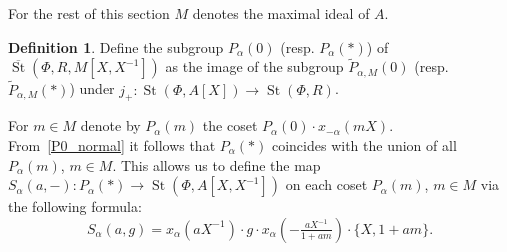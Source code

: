 \documentclass[oneside, 8pt]{amsart}
\theoremstyle{remark}
\theoremstyle{definition}
\numberwithin{lemma}{section}
\numberwithin{prop}{section}
\numberwithin{corollary}{section}
\numberwithin{externaltheorem}{section}
\newtheorem{df}[lemma]{Definition} \Crefname{df}{Definition}{Definitions}
\DeclareMathOperator{\St}{St}
\numberwithin{equation}{section}
\begin{document}
For the rest of this section $M$ denotes the maximal ideal of $A$.
\begin{df}\label{S-def}
Define the subgroup $P_\alpha(0)$ (resp. $P_{\alpha}(*)$) of $\overline{\St}(\Phi, R, M[X, X^{-1}])$
 as the image of the subgroup $\widetilde{P}_{\alpha, M}(0)$ (resp. $\widetilde{P}_{\alpha, M}(*)$) 
 under $j_+ \colon \St(\Phi, A[X]) \to \St(\Phi, R)$.

For $m \in M$ denote by $P_\alpha(m)$ the coset $P_\alpha(0) \cdot x_{-\alpha}(mX)$.
From~\cref{P0_normal} it follows that $P_\alpha(*)$ coincides with the union of all $P_\alpha(m)$, $m\in M$. This allows us to define the map $S_\alpha(a, -) \colon P_\alpha(*) \to \St(\Phi, A[X, X^{-1}])$ on each coset $P_\alpha(m)$, $m \in M$ via the following formula:
\begin{equation}\label{eq:S-def} S_\alpha(a, g) = x_\alpha(aX^{-1})\cdot g \cdot x_\alpha\left(-\tfrac{aX^{-1}}{1 + am}\right) \cdot \{X, 1+ am\}.\end{equation} \end{df}
\end{document}
